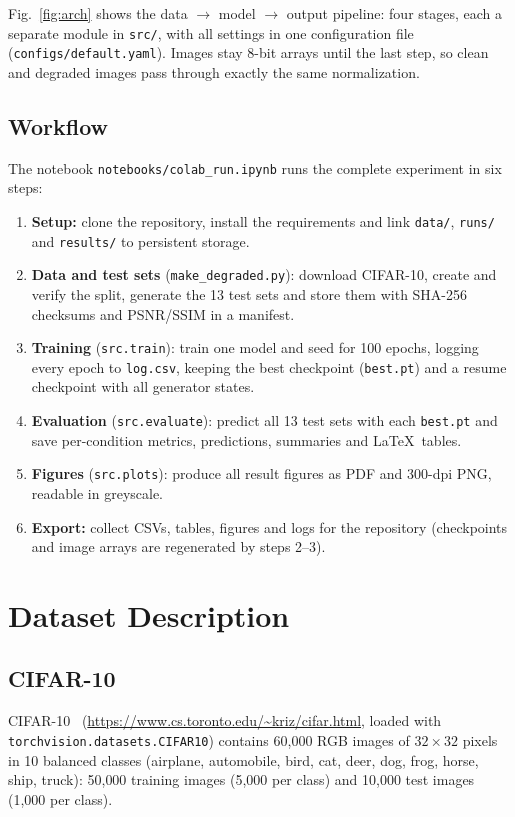\documentclass[conference]{IEEEtran}
\begin{document}
Fig.~\ref{fig:arch} shows the data $\rightarrow$ model $\rightarrow$ output pipeline: four stages, each a separate module in \texttt{src/}, with all settings in one configuration file (\texttt{configs/default.yaml}). Images stay 8-bit arrays until the last step, so clean and degraded images pass through exactly the same normalization.

\subsection{Workflow}
The notebook \texttt{notebooks/colab\_run.ipynb} runs the complete experiment in six steps:
\begin{enumerate}
\item \textbf{Setup:} clone the repository, install the requirements and link \texttt{data/}, \texttt{runs/} and \texttt{results/} to persistent storage.
\item \textbf{Data and test sets} (\texttt{make\_degraded.py}): download CIFAR-10, create and verify the split, generate the 13 test sets and store them with SHA-256 checksums and PSNR/SSIM in a manifest.
\item \textbf{Training} (\texttt{src.train}): train one model and seed for 100 epochs, logging every epoch to \texttt{log.csv}, keeping the best checkpoint (\texttt{best.pt}) and a resume checkpoint with all generator states.
\item \textbf{Evaluation} (\texttt{src.evaluate}): predict all 13 test sets with each \texttt{best.pt} and save per-condition metrics, predictions, summaries and \LaTeX\ tables.
\item \textbf{Figures} (\texttt{src.plots}): produce all result figures as PDF and 300-dpi PNG, readable in greyscale.
\item \textbf{Export:} collect CSVs, tables, figures and logs for the repository (checkpoints and image arrays are regenerated by steps 2--3).
\end{enumerate}

\section{Dataset Description}

\subsection{CIFAR-10}
CIFAR-10~\cite{krizhevsky2009} (\url{https://www.cs.toronto.edu/~kriz/cifar.html}, loaded with \texttt{torchvision.datasets.CIFAR10}) contains 60{,}000 RGB images of $32\times32$ pixels in 10 balanced classes (airplane, automobile, bird, cat, deer, dog, frog, horse, ship, truck): 50{,}000 training images (5{,}000 per class) and 10{,}000 test images (1{,}000 per class).
\end{document}
